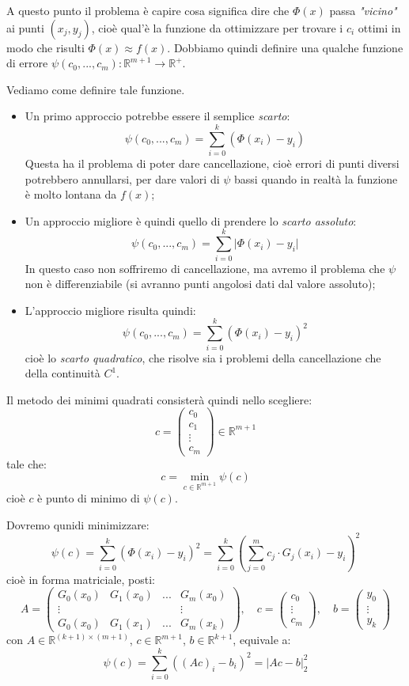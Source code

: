 \documentclass[a4paper,11pt]{article}
\begin{document}
\par\smallskip

A questo punto il problema è capire cosa significa dire che $\Phi(x)$ passa \textit{"vicino"} ai punti $(x_j, y_j)$, cioè qual'è la funzione da ottimizzare per trovare i $c_i$ ottimi in modo che risulti $\Phi(x) \approx f(x)$.
Dobbiamo quindi definire una qualche funzione di errore $\psi(c_0, ..., c_m) : \mathbb{R}^{m + 1} \rightarrow \mathbb{R}^+$.

Vediamo come definire tale funzione.
\begin{itemize}
	\item Un primo approccio potrebbe essere il semplice \textit{scarto}:
		$$
		\psi(c_0, ..., c_m) = \sum_{i = 0}^k \left( \Phi(x_i) - y_i \right)
		$$
		Questa ha il problema di poter dare cancellazione, cioè errori di punti diversi potrebbero annullarsi, per dare valori di $\psi$ bassi quando in realtà la funzione è molto lontana da $f(x)$;
	\item Un approccio migliore è quindi quello di prendere lo \textit{scarto assoluto}:
		$$
		\psi(c_0, ..., c_m) = \sum_{i = 0}^k \Big| \Phi(x_i) - y_i \Big|
		$$
		In questo caso non soffriremo di cancellazione, ma avremo il problema che $\psi$ non è differenziabile (si avranno punti angolosi dati dal valore assoluto);
	\item L'approccio migliore risulta quindi:
		$$
		\psi(c_0, ..., c_m) = \sum_{i = 0}^k \left( \Phi(x_i) - y_i \right)^2
		$$
		cioè lo \textit{scarto quadratico}, che risolve sia i problemi della cancellazione che della continuità $C^1$.
\end{itemize}

Il metodo dei minimi quadrati consisterà quindi nello scegliere:
$$
c = 
\begin{pmatrix}
	c_0 \\ c_1 \\ \vdots \\ c_m
\end{pmatrix}
\in \mathbb{R}^{m + 1}
$$
tale che:
$$
c = \min_{c \in \mathbb{R}^{m + 1}} \psi(c)
$$
cioè $c$ è punto di minimo di $\psi(c)$.

Dovremo qunidi minimizzare:
$$
\psi(c) = \sum_{i = 0}^k \left( \Phi(x_i) - y_i \right)^2 = \sum_{i = 0}^k \left( \sum_{j = 0}^m c_j \cdot G_j(x_i) - y_i \right)^2
$$
cioè in forma matriciale, posti:
$$
A =
\begin{pmatrix}
	G_0(x_0) & G_1(x_0) & ... & G_m(x_0) \\
	\vdots & & & \vdots \\
	G_0(x_0) & G_1(x_1) & ... & G_m(x_k)
\end{pmatrix}, \quad
c =
\begin{pmatrix}
	c_0 \\ \vdots \\ c_m
\end{pmatrix}, \quad
b = 
\begin{pmatrix}
	y_0 \\ \vdots \\ y_k
\end{pmatrix}
$$
con $A \in \mathbb{R}^{ (k + 1) \times (m + 1) }$, $c \in \mathbb{R}^{m + 1}$, $b \in \mathbb{R}^{k + 1}$, equivale a:
$$
\psi(c) = \sum_{i = 0}^k \left( (Ac)_i - b_i \right)^2 = \Big| Ac - b \Big|_2^2
$$
\end{document}

